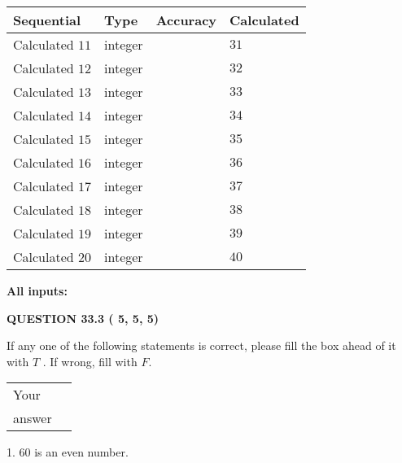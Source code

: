 \documentclass[12pt]{article}
\begin{document}
  
\noindent\begin{tabular}{|l|l|l|l|}
\hline
 Sequential & Type & Accuracy & Calculated \\ 
\hline
 
 
  Calculated $          11$ & integer &  & 
  $ 31 $ 
 \\  \hline  
 
 
  Calculated $          12$ & integer &  & 
  $ 32 $ 
 \\  \hline  
 
 
  Calculated $          13$ & integer &  & 
  $ 33 $ 
 \\  \hline  
 
 
  Calculated $          14$ & integer &  & 
  $ 34 $ 
 \\  \hline  
 
 
  Calculated $          15$ & integer &  & 
  $ 35 $ 
 \\  \hline  
 
 
  Calculated $          16$ & integer &  & 
  $ 36 $ 
 \\  \hline  
 
 
  Calculated $          17$ & integer &  & 
  $ 37 $ 
 \\  \hline  
 
 
  Calculated $          18$ & integer &  & 
  $ 38 $ 
 \\  \hline  
 
 
  Calculated $          19$ & integer &  & 
  $ 39 $ 
 \\  \hline  
 
 
  Calculated $          20$ & integer &  & 
  $ 40 $ 
 \\  \hline  
 \end{tabular}
   
   
   
   
\noindent\vspace{0.1in}\hspace{-0.08in} {\textbf{\Large{All inputs: }}}
   
   
  
\vspace{0.2in}
  
{\textbf{\Large{QUESTION
33.3 
 (          5,          5,          5)
}}}
  
  
If any one of the following statements is correct, please fill the box ahead of it with $T$ .
If wrong, fill with $F$.
 
\noindent\begin{tabular}{|l|l|}\hline Your&\hspace{.2in} \\ answer&\hspace{.2in} \\ \hline \end{tabular}
1. $ %
60$ is an  %
even number.
 
\end{document}
